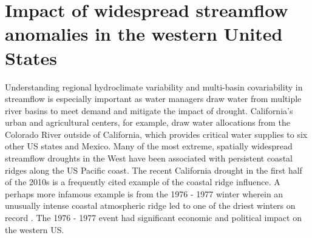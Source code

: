 \documentclass[final, double]{ua-thesis}
\begin{document}
\section{Impact of widespread streamflow anomalies in the western United States}

Understanding regional hydroclimate variability and multi-basin covariability in streamflow is especially important as water managers draw water from multiple river basins to meet demand and mitigate the impact of drought. California's urban and agricultural centers, for example, draw water allocations from the Colorado River outside of California, which provides critical water supplies to six other US states and Mexico. Many of the most extreme, spatially widespread streamflow droughts in the West have been associated with persistent coastal ridges along the US Pacific coast. The recent California drought in the first half of the 2010s is a frequently cited example of the coastal ridge influence. A perhaps more infamous example is from the 1976 - 1977 winter wherein an unusually intense coastal atmospheric ridge led to one of the driest winters on record \citep[e.g., ][]{seager_causes_2014}. The 1976 - 1977 event had significant economic and political impact on the western US.
\end{document}
